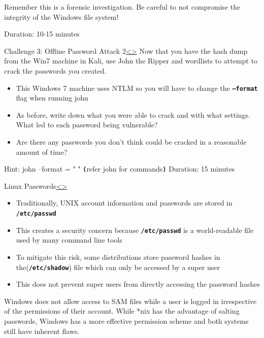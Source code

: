\documentclass[12pt]{article}
\newcommand{\code}[1]{\texttt{\bfseries#1}}
\newenvironment{instructionblock}{\Large\bgroup}{\egroup}
\newcommand{\bi}{\begin{itemize}}
\newcommand{\ei}{\end{itemize}}
\begin{document}
Remember this is a forensic investigation. Be careful to not compromise the integrity of the Windows file system!

\vfill 
Duration: 10-15 minutes




\pagebreak
\begin{slide}{Challenge 3: Offline Password Attack 2}{\hyperref[slide 16]{\textless}\hyperref[slide 18]{\textgreater}}
	\begin{instructionblock}
		Now that you have the hash dump from the Win7 machine in Kali, use John the Ripper and wordlists to attempt to crack the passwords you created.
		\bi 
			\item This Windows 7 machine uses NTLM so you will have to change the \code{--format} flag when running john
			\item As before, write down what you were able to crack and with what settings. What led to each password being vulnerable?
			\item Are there any passwords you don't think could be cracked in a reasonable amount of time?
		\ei
	\end{instructionblock}
\end{slide}
Hint: john --format = " " \code(refer john for commands\code) 
\vfill
Duration: 15 minutes


\pagebreak
\begin{slide}{Linux Passwords}{\hyperref[slide 17]{\textless}\hyperref[slide 19]{\textgreater}}
	\begin{instructionblock}
		\begin{itemize}
			\item Traditionally, UNIX account information and passwords are stored in \code{/etc/passwd}
			\item This creates a security concern because \code{/etc/passwd} is a world-readable file used by many command line tools
			\item To mitigate this risk, some distributions store password hashes in the(\code{/etc/shadow}) file which can only be accessed by a super user
			\item This does not prevent super users from directly accessing the password hashes
		\end{itemize}
	\end{instructionblock}
\end{slide}
Windows does not allow access to SAM files while a user is logged in irrespective of the permissions of their account. While *nix has the advantage of salting passwords, Windows has a more effective permission scheme and both systems still have inherent flaws.
\end{document}
